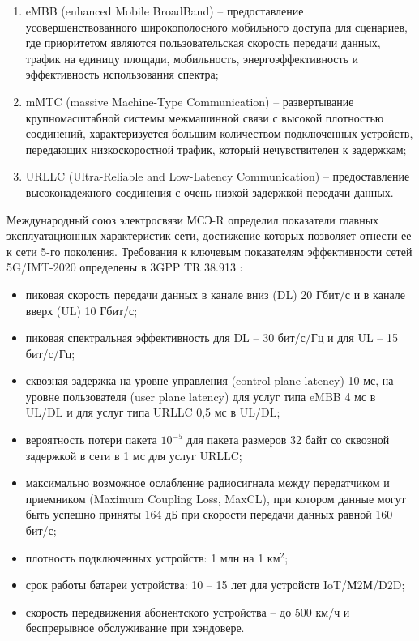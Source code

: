 \begin{enumerate}
  \item eMBB (enhanced Mobile BroadBand) -- предоставление усовершенствованного широкополосного мобильного доступа для сценариев, где приоритетом являются пользовательская скорость передачи данных, трафик на единицу площади, мобильность, энергоэффективность и эффективность использования спектра;
  \item mMTC (massive Machine-Type Communication) -- развертывание крупномасштабной системы межмашинной связи с высокой плотностью соединений, характеризуется большим количеством подключенных устройств, передающих низкоскоростной трафик, который нечувствителен к задержкам;
  \item URLLC (Ultra-Reliable and Low-Latency Communication) -- предоставление высоконадежного соединения с очень низкой задержкой передачи данных.
\end{enumerate}


Международный союз электросвязи МСЭ-R определил показатели главных
эксплуатационных характеристик сети, достижение которых позволяет отнести ее к сети 5-го поколения. Требования к ключевым показателям эффективности сетей 5G/IMT-2020 определены в 3GPP TR 38.913 \cite{3GPP_TR_38_913}:
\begin{itemize}
  \item пиковая скорость передачи данных  в канале вниз (DL) 20 Гбит/с и в канале вверх (UL) 10 Гбит/с;
  \item пиковая спектральная эффективность для DL – 30 бит/с/Гц и для UL – 15 бит/с/Гц;
  \item сквозная задержка на уровне управления (control plane latency) 10 мс, на уровне пользователя (user plane latency) для услуг типа eMBB 4 мс в UL/DL и  для услуг типа URLLC 0,5 мс в UL/DL;  
  \item вероятность потери пакета $10^{-5}$ для пакета размеров 32 байт со сквозной задержкой в сети в 1 мс для услуг URLLC;
  \item  максимально возможное ослабление радиосигнала между передатчиком и приемником (Maximum Coupling Loss, MaxCL), при котором данные могут быть успешно приняты 164 дБ при скорости передачи данных равной 160 бит/с; 
  \item плотность подключенных устройств: 1 млн на 1 $\text{км}^2$;
  \item срок работы батареи устройства: 10 – 15 лет для устройств IoT/М2М/D2D; 
  \item скорость передвижения абонентского устройства – до 500 км/ч и беспрерывное обслуживание при хэндовере.
\end{itemize}

